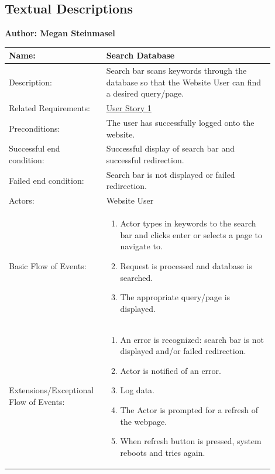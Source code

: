 \documentclass[11pt]{article}
\begin{document}
\subsection*{Textual Descriptions}

\begin{table}[!ht]
\begin{center}
\textbf{Author: Megan Steinmasel}
\vspace*{1em}

\begin{tabular}{p{0.30\linewidth}p{0.60\linewidth}}
	Name: & Search Database\\\hline
	Description: & Search bar scans keywords through the database so that the Website User can find a desired query/page.\\\hline
	Related Requirements:& \hyperlink{us1}{User Story 1}\\\hline
	Preconditions:& The user has successfully logged onto the website.\\\hline
	Successful end condition:& Successful display of search bar and successful redirection.\\\hline
	Failed end condition:& Search bar is not displayed or failed redirection. \\\hline
	Actors:& Website User\\\hline
	Basic Flow of Events: & \begin{enumerate}
	\item Actor types in keywords to the search bar and clicks enter or selects a page to navigate to.
	\item Request is processed and database is searched.
	\item The appropriate query/page is displayed.
	\end{enumerate}\\\hline
	Extensions/Exceptional Flow of Events: & \begin{enumerate}
	\item An error is recognized: search bar is not displayed and/or failed redirection.
	\item Actor is notified of an error.
	\item Log data.
	\item The Actor is prompted for a refresh of the webpage.
	\item When refresh button is pressed, system reboots and tries again.
	\end{enumerate}
\end{tabular}
\label{des:search_nav_menu}	
\end{center}
\end{table}
\end{document}
